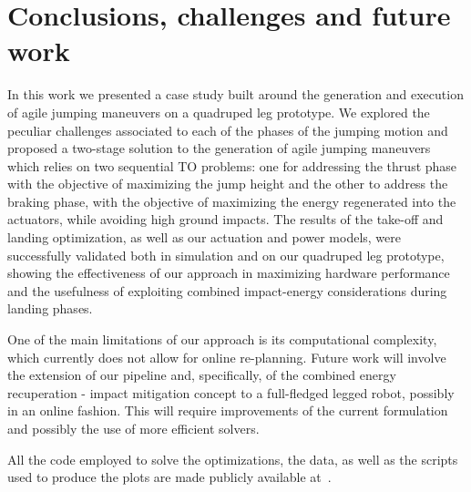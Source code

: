 \section{Conclusions, challenges and future work}\label{sec:conclusions}
In this work we presented a case study built around the generation and execution of agile jumping maneuvers on a quadruped leg prototype.  
We explored the peculiar challenges associated to each of the phases of the jumping motion and proposed a two-stage solution to the generation of agile jumping maneuvers which relies on two sequential TO problems: one for addressing the thrust phase with the objective of maximizing the jump height and the other to address the braking phase, with the objective of maximizing the energy regenerated into the actuators, while avoiding high ground impacts. The results of the take-off and landing optimization, as well as our actuation and power models, were successfully validated both in simulation and on our quadruped leg prototype, showing the effectiveness of our approach in maximizing hardware performance and the usefulness of exploiting combined impact-energy considerations during landing phases.

One of the main limitations of our approach is its computational complexity, which currently does not allow for online re-planning. Future work will involve the extension of our pipeline and, specifically, of the combined energy recuperation - impact mitigation concept to a full-fledged legged robot, possibly in an online fashion. This will require improvements of the current formulation and possibly the use of more efficient solvers.  

All the code employed to solve the optimizations, the  data, as well as the scripts used to produce the plots are made publicly available at~\cite{url::awesome_leg_repo}.